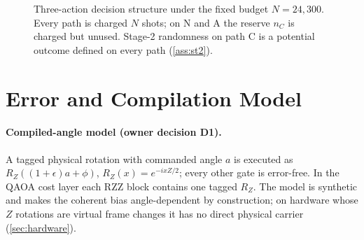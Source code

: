 \documentclass[10pt,twocolumn]{article}
\theoremstyle{definition}
\theoremstyle{remark}
\newcommand{\eps}{\epsilon}
\newcommand{\lA}{\lambda_A}
\newcommand{\lF}{\lambda_F}
\newcommand{\RZ}{R_Z}
\newcommand{\one}{\mathbf 1}
\begin{document}
\begin{figure}[t]
\centering
{}
\caption{Three-action decision structure under the fixed budget $N=24{,}300$. Every path is charged $N$ shots; on N and A the reserve $n_C$ is charged but unused. Stage-2 randomness on path C is a potential outcome defined on every path (\cref{ass:st2}).}
\label{fig:actions}
\end{figure}

\section{Error and Compilation Model}\label{sec:model}

\paragraph{Compiled-angle model (owner decision D1).} A tagged physical rotation with commanded angle $a$ is executed as $\RZ((1+\eps)a+\phi)$, $\RZ(x)=e^{-ixZ/2}$; every other gate is error-free. In the QAOA cost layer each $\mathrm{RZZ}$ block contains one tagged $\RZ$. The model is synthetic and makes the coherent bias angle-dependent by construction; on hardware whose $Z$ rotations are virtual frame changes it has no direct physical carrier (\cref{sec:hardware}).
\end{document}
